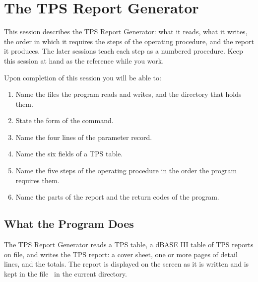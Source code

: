 \chapter{The TPS Report Generator}

This session describes the TPS Report Generator:
what it reads, what it writes, the order in which it requires the steps of
the operating procedure, and the report it produces.  The later sessions
teach each step as a numbered procedure.  Keep this session at hand as the
reference while you work.

Upon completion of this session you will be able to:
\begin{enumerate}
\item Name the files the program reads and writes, and the directory that
  holds them.
\item State the form of the  command.
\item Name the four lines of the parameter record.
\item Name the six fields of a TPS table.
\item Name the five steps of the operating procedure in the order the
  program requires them.
\item Name the parts of the report and the return codes of the program.
\end{enumerate}

\section{What the Program Does}
The TPS Report Generator reads a TPS table, a dBASE III table of TPS
reports on file, and writes the TPS report: a cover sheet, one or more
pages of detail lines, and the totals.  The report is displayed on the
screen as it is written and is kept in the file \rpt\ in the current
directory.


